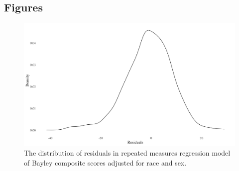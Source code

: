 \documentclass{article}
\begin{document}
\subsection{Figures}

\vspace{1mm}
\begin{figure}[h]
	\label{fig:skew_resids}
	\caption{The distribution of residuals in repeated measures regression model of Bayley composite scores adjusted for race and sex.}
	\centering
	\includegraphics[scale = 0.14]{bayley_resids_plot}
\end{figure}
\end{document}
